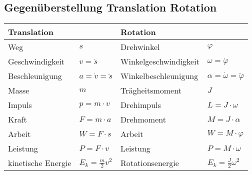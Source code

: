 \subsection*{Gegenüberstellung Translation Rotation}
\begin{center}
    \begin{tabular}{l l | l l}
        Translation & & Rotation & \\
        \hline
        Weg & $s$ & Drehwinkel & $\varphi$\\
        Geschwindigkeit & $v=\dot{s}$ & Winkelgeschwindigkeit & $\omega = \dot \varphi$\\
        Beschleunigung & $a=\dot{v}=\ddot{s}$ & Winkelbeschleunigung & $\alpha=\dot{\omega}=\ddot{\varphi}$\\
        Masse & $m$ & Trägheitsmoment & $J$\\
        Impuls & $p=m\cdot v$ & Drehimpuls & $L=J\cdot \omega$\\
        Kraft & $F=m\cdot a$ & Drehmoment & $M=J\cdot \alpha$\\
        Arbeit\footnotemark & $W=F\cdot s$ & Arbeit\footnotemark[1] & $W=M\cdot \varphi$\\
        Leistung\footnotemark[1] & $P=F\cdot v$ & Leistung\footnotemark[1] & $P=M\cdot\omega$\\
        kinetische Energie & $E_k=\frac{m}{2}v^2$ & Rotationsenergie & $E_k=\frac{J}{2}\omega^2$
    \end{tabular}
\end{center}
